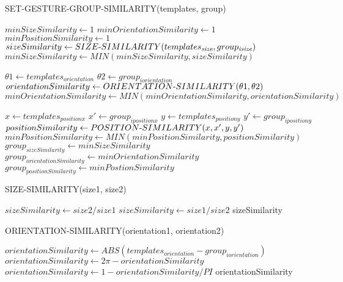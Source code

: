 \begin{algorithm}
  \caption*{SET-GESTURE-GROUP-SIMILARITY(templates, group)}
  \begin{algorithmic}[1]
  \State $minSizeSimilarity\gets 1$
   \State $minOrientationSimilarity\gets 1$
    \State $minPositionSimilarity\gets 1$
	\State $sizeSimilarity\gets SIZE\mathchar`-SIMILARITY(templates_\textit{size}, group_\textit{isize})$
	\State $minSizeSimilarity\gets MIN(minSizeSimilarity, sizeSimilarity)$
	
	\State $\theta 1\gets templates_\textit{orientation}$
	\State $\theta 2\gets group_\textit{iorientation}$
	\State $orientationSimilarity\gets ORIENTATION\mathchar`-SIMILARITY(\theta 1, \theta 2)$
	\State $minOrientationSimilarity\gets MIN(minOrientationSimilarity, orientationSimilarity)$
	
	\State $x\gets templates_\textit{positionx}$
	\State $x'\gets group_\textit{ipositionx}$
	\State $y\gets templates_\textit{positiony}$
	\State $y'\gets group_\textit{ipositiony}$
	\State $positionSimilarity\gets POSITION\mathchar`-SIMILARITY(x, x', y, y')$
	\State $minPositionSimilarity\gets MIN(minPositionSimilarity, positionSimilarity)$
  \EndFor
  \State $group_\textit{sizeSimilarity}\gets minSizeSimilarity$
  \State $group_\textit{orientationSimilarity}\gets minOrientationSimilarity$
  \State $group_\textit{positionSimilarity}\gets minPostionSimilarity$
\end{algorithmic}
\end{algorithm}

\begin{algorithm}
  \caption*{SIZE-SIMILARITY(size1, size2)}
  \begin{algorithmic}[1]
 		 \State $sizeSimilarity\gets size2 / size1$
	\Else
		\State $sizeSimilarity\gets size1 / size2$
	\EndIf
   \Return sizeSimilarity
\end{algorithmic}
\end{algorithm}

\begin{algorithm}
  \caption*{ORIENTATION-SIMILARITY(orientation1, orientation2)}
  \begin{algorithmic}[1]
  \State $orientationSimilarity\gets ABS(templates_\textit{orientation} - group_\textit{iorientation})$
		\State $orientationSimilarity\gets 2\pi - orientationSimilarity$
	\EndIf
	\State $orientationSimilarity\gets 1 - orientationSimilarity / PI$
    \Return orientationSimilarity
\end{algorithmic}
\end{algorithm}

